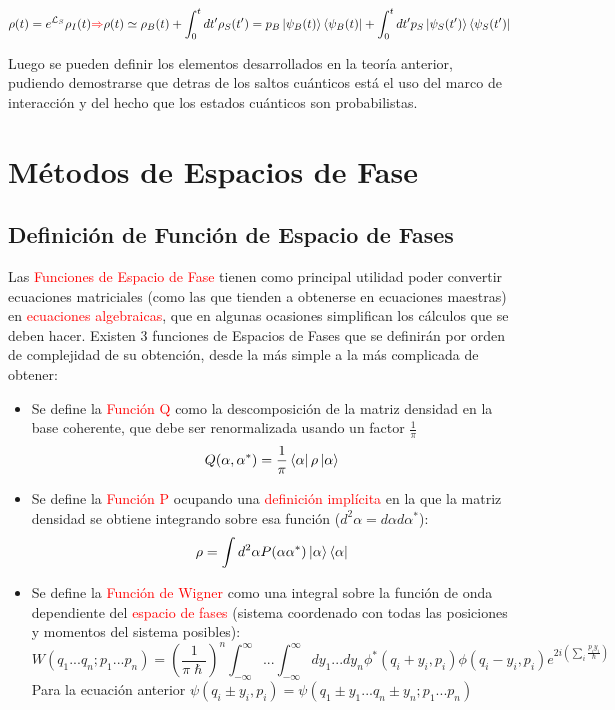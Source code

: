 \documentclass{book}
\begin{document}
\begin{equation}\label{eq4.17}\rho(t)=e^{\mathcal{L}_S}\rho_{I}(t)\textcolor{red}{\Rightarrow} \rho(t)\simeq \rho_B(t)+\int_0^t dt^\prime \rho_S(t^\prime)= p_B \ket{\psi_B(t)}\bra{\psi_B(t)}+\int_0^t dt^\prime p_S\ket{\psi_S(t^\prime)}\bra{\psi_S(t^\prime)}\end{equation}

Luego se pueden definir los elementos desarrollados en la teoría anterior, pudiendo demostrarse que detras de los saltos cuánticos está el uso del marco de interacción y del hecho que los estados cuánticos son probabilistas.

\chapter{Métodos de Espacios de Fase}
\section{Definición de Función de Espacio de Fases}
Las \textcolor{red}{Funciones de Espacio de Fase} tienen como principal utilidad poder convertir ecuaciones matriciales (como las que tienden a obtenerse en ecuaciones maestras) en \textcolor{red}{ecuaciones algebraicas}, que en algunas ocasiones simplifican los cálculos que se deben hacer. Existen 3 funciones de Espacios de Fases que se definirán por orden de complejidad de su obtención, desde la más simple a la más complicada de obtener:

\begin{itemize}
    \item Se define la \textcolor{red}{Función Q}  como la descomposición de la matriz densidad en la base coherente, que debe ser renormalizada usando un factor $\frac{1}{\pi}$
    \begin{equation}\label{eq5.1}Q(\alpha,\alpha^*)=\frac{1}{\pi}\bra{\alpha}\rho\ket{\alpha}\end{equation}
    \item Se define la \textcolor{red}{Función P} ocupando una \textcolor{red}{definición implícita} en la que la matriz densidad se obtiene integrando sobre esa función ($d^2\alpha=d\alpha d\alpha^*$):
    \begin{equation}\label{eq5.2}\rho=\int d^2 \alpha P(\alpha\alpha^*)\ket{\alpha}\bra{\alpha}\end{equation}
    \item Se define la \textcolor{red}{Función de Wigner} como una integral sobre la función de onda dependiente del \textcolor{red}{espacio de fases} (sistema coordenado con todas las posiciones y momentos del sistema posibles):
    \begin{equation}\label{eq5.3}W(q_1...q_n;p_1...p_n)=(\frac{1}{\pi\hslash})^n\int_{-\infty}^\infty ...\int_{-\infty}^\infty  dy_1...dy_n\phi^*(q_i+y_i,p_i)\phi(q_i-y_i,p_i)e^{2i(\sum_i\frac{p_iy_i}{\hslash})}\end{equation}
    Para la ecuación anterior $\psi(q_i\pm y_i,p_i)=\psi(q_1\pm y_1...q_n\pm y_n;p_1...p_n)$
\end{itemize}
\end{document}
